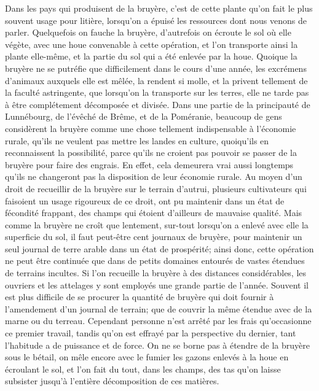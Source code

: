 Dans les pays qui produisent de la bruyère, c'est de cette plante qu'on fait le plus souvent usage pour litière, lorsqu'on a épuisé les ressources dont nous venons de parler. Quelquefois on fauche la bruyère, d'autrefois on écroute le sol où elle végète, avec une houe convenable à cette opération, et l'on transporte ainsi la plante elle-même, et la partie du sol qui a été enlevée par la houe. Quoique la bruyère ne se putréfie que difficilement dans le cours d'une année, les excrémens d'animaux auxquels elle est mêlée, la rendent si molle, et la privent tellement de la faculté astringente, que lorsqu'on la transporte sur les terres, elle ne tarde pas à être complétement décomposée et divisée. Dans une partie de la principauté de Lunnébourg,\setcounter{page}{64} de l'évêché de Brême, et de la Poméranie, beaucoup de gens considèrent la bruyère comme une chose tellement indispensable à l'économie rurale, qu'ils ne veulent pas mettre les landes en culture, quoiqu'ils en reconnaissent la possibilité, parce qu'ils ne croient pas pouvoir se passer de la bruyère pour faire des engrais.
En effet, cela demeurera vrai aussi longtemps qu'ils ne changeront pas la disposition de leur économie rurale. Au moyen d'un droit de recueillir de la bruyère sur le terrain d'autrui, plusieurs cultivateurs qui faisoient un usage rigoureux de ce droit, ont pu maintenir dans un état de fécondité frappant, des champs qui étoient d'ailleurs de mauvaise qualité. Mais comme la bruyère ne croît que lentement, sur-tout lorsqu'on a enlevé avec elle la superficie du sol, il faut peut-être cent journaux de bruyère, pour maintenir un seul journal de terre arable dans un état de prospérité; ainsi donc, cette opération ne peut être continuée que dans de petits domaines entourés de vastes étendues de terrains incultes. Si l'on recueille la bruyère à des distances considérables, les ouvriers et les attelages y sont employés une grande partie de l'année. Souvent il est plus\setcounter{page}{65} difficile de se procurer la quantité de bruyère qui doit fournir à l'amendement d'un journal de terrain; que de couvrir la même étendue avec de la marne ou du terreau. Cependant personne n'est arrêté par les frais qu'occasionne ce premier travail, tandis qu'on est effrayé par la perspective du dernier, tant l'habitude a de puissance et de force.
On ne se borne pas à étendre de la bruyère sous le bétail, on mêle encore avec le fumier les gazons enlevés à la houe en écroulant le sol, et l'on fait du tout, dans les champs, des tas qu'on laisse subsister jusqu'à l'entière décomposition de ces matières.
